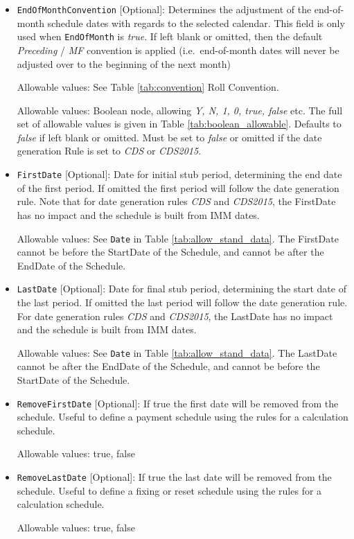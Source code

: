 \begin{itemize}
\item \lstinline!EndOfMonthConvention! [Optional]: Determines the adjustment of the end-of-month schedule dates with regards to the selected calendar.
This field is only used when \lstinline!EndOfMonth! is \emph{true}. If left blank or omitted, then the default \emph{Preceding} / \emph{MF} convention is applied
(i.e.\ end-of-month dates will never be adjusted over to the beginning of the next month)

Allowable values: See Table \ref{tab:convention} Roll Convention.

Allowable values: Boolean node, allowing \emph{Y, N, 1, 0, true, false} etc. The full set of allowable values is given in Table \ref{tab:boolean_allowable}. Defaults to \emph{false} if left blank or omitted. Must be set to \emph{false} or omitted if the date generation Rule is set to \emph{CDS} or \emph{CDS2015}.

\item \lstinline!FirstDate! [Optional]: Date for initial stub period, determining the end date of the first period.  If omitted the first period will follow the date generation rule.  
Note that for date generation rules \emph{CDS} and \emph{CDS2015}, the
   FirstDate has no impact and the schedule is built from IMM dates.

Allowable values: See \lstinline!Date! in Table \ref{tab:allow_stand_data}. The FirstDate cannot be before the StartDate of the Schedule, and cannot be after the EndDate of the Schedule.


\item \lstinline!LastDate! [Optional]: Date for final stub period, determining the start date of the last period. If omitted the last period will follow the date generation rule.
For date generation rules \emph{CDS} and \emph{CDS2015}, the
LastDate has no impact and the schedule is built from IMM dates.

Allowable values: See \lstinline!Date! in Table \ref{tab:allow_stand_data}. The LastDate cannot be after the EndDate of the Schedule, and cannot be before the StartDate of the Schedule.

\item \lstinline!RemoveFirstDate! [Optional]: If true the first date will be removed from the schedule. Useful to define a payment schedule using the rules for a calculation schedule.

Allowable values: true, false

\item \lstinline!RemoveLastDate! [Optional]: If true the last date will be removed from the schedule. Useful to define a fixing or reset schedule using the rules for a calculation schedule.

Allowable values: true, false

\end{itemize}


